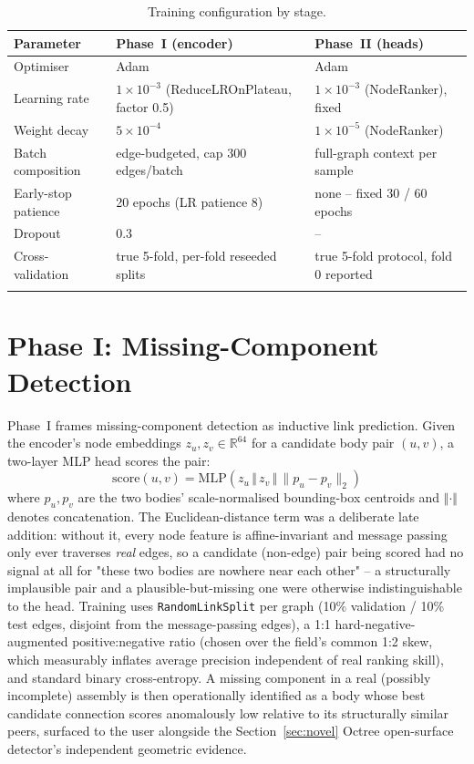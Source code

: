 \documentclass[sn-mathphys,Numbered]{sn-jnl}
\begin{document}
\begin{table}[h]
\caption{Training configuration by stage.}\label{tab:hyperparams}
\begin{tabularx}{\linewidth}{@{}lXX@{}}
\toprule
Parameter & Phase~I (encoder) & Phase~II (heads) \\
\midrule
Optimiser & Adam & Adam \\
Learning rate & $1\times10^{-3}$ (ReduceLROnPlateau, factor 0.5) & $1\times10^{-3}$ (NodeRanker), fixed \\
Weight decay & $5\times10^{-4}$ & $1\times10^{-5}$ (NodeRanker) \\
Batch composition & edge-budgeted, cap 300 edges/batch & full-graph context per sample \\
Early-stop patience & 20 epochs (LR patience 8) & none -- fixed 30 / 60 epochs \\
Dropout & 0.3 & -- \\
Cross-validation & true 5-fold, per-fold reseeded splits & true 5-fold protocol, fold 0 reported \\
\botrule
\end{tabularx}
\end{table}

\section{Phase I: Missing-Component Detection}\label{sec:phase1}

Phase~I frames missing-component detection as inductive link prediction. Given the encoder's node embeddings $z_u, z_v \in \mathbb{R}^{64}$ for a candidate body pair $(u,v)$, a two-layer MLP head scores the pair:
\begin{equation}
\text{score}(u,v) = \text{MLP}\!\left(z_u \,\Vert\, z_v \,\Vert\, \lVert p_u - p_v \rVert_2\right)
\label{eq:linkscore}
\end{equation}
where $p_u, p_v$ are the two bodies' scale-normalised bounding-box centroids and $\Vert \cdot \Vert$ denotes concatenation. The Euclidean-distance term was a deliberate late addition: without it, every node feature is affine-invariant and message passing only ever traverses \emph{real} edges, so a candidate (non-edge) pair being scored had no signal at all for "these two bodies are nowhere near each other" -- a structurally implausible pair and a plausible-but-missing one were otherwise indistinguishable to the head. Training uses \texttt{RandomLinkSplit} per graph (10\% validation / 10\% test edges, disjoint from the message-passing edges), a 1:1 hard-negative-augmented positive:negative ratio (chosen over the field's common 1:2 skew, which measurably inflates average precision independent of real ranking skill), and standard binary cross-entropy. A missing component in a real (possibly incomplete) assembly is then operationally identified as a body whose best candidate connection scores anomalously low relative to its structurally similar peers, surfaced to the user alongside the Section~\ref{sec:novel} Octree open-surface detector's independent geometric evidence.
\end{document}
